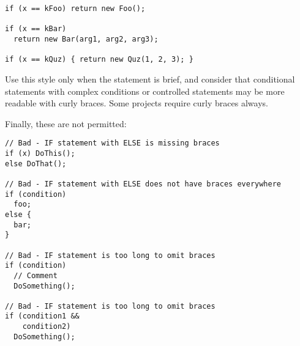 \begin{verbatim}
if (x == kFoo) return new Foo();

if (x == kBar)
  return new Bar(arg1, arg2, arg3);

if (x == kQuz) { return new Quz(1, 2, 3); }
\end{verbatim}

Use this style only when the statement is brief, and consider that conditional statements with complex conditions or controlled statements may be more readable with curly braces. Some projects require curly braces always.

Finally, these are not permitted:
\begin{verbatim}
// Bad - IF statement with ELSE is missing braces
if (x) DoThis();
else DoThat();

// Bad - IF statement with ELSE does not have braces everywhere
if (condition)
  foo;
else {
  bar;
}

// Bad - IF statement is too long to omit braces
if (condition)
  // Comment
  DoSomething();

// Bad - IF statement is too long to omit braces
if (condition1 &&
    condition2)
  DoSomething();
\end{verbatim}
